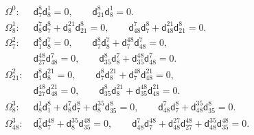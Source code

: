 \documentclass[10pt,a4paper,reqno]{article}
\theoremstyle{definition}
\numberwithin{equation}{section}
\newcommand{\ddtwo}[2]{\mathsf d^{#1}_{#2}}          %
\begin{document}
\begin{table}[htp!]
\centering
\[
\begin{aligned}
\Omega^0:\ & \ddtwo{8}{7}\ddtwo{1}{8}=0,\qquad \ddtwo{8}{21}\ddtwo{1}{8}=0.\\[2pt]
\Omega^1_8:\ & \ddtwo{7}{8}\ddtwo{8}{7}+\ddtwo{21}{8}\ddtwo{8}{21}=0,\qquad
              \ddtwo{7}{48}\ddtwo{8}{7}+\ddtwo{21}{48}\ddtwo{8}{21}=0.\\[2pt]
\Omega^2_7:\ & \ddtwo{8}{1}\ddtwo{7}{8}=0,\qquad
               \ddtwo{8}{7}\ddtwo{7}{8}+\ddtwo{48}{7}\ddtwo{7}{48}=0,\\
             & \ddtwo{48}{27}\ddtwo{7}{48}=0,\qquad
               \ddtwo{8}{35}\ddtwo{7}{8}+\ddtwo{48}{35}\ddtwo{7}{48}=0.\\[2pt]
\Omega^2_{21}:\ & \ddtwo{8}{1}\ddtwo{21}{8}=0,\qquad
                  \ddtwo{8}{7}\ddtwo{21}{8}+\ddtwo{48}{7}\ddtwo{21}{48}=0,\\
                & \ddtwo{48}{27}\ddtwo{21}{48}=0,\qquad
                  \ddtwo{8}{35}\ddtwo{21}{8}+\ddtwo{48}{35}\ddtwo{21}{48}=0.\\[2pt]
\Omega^3_8:\ & \ddtwo{1}{8}\ddtwo{8}{1}+\ddtwo{7}{8}\ddtwo{8}{7}+\ddtwo{35}{8}\ddtwo{8}{35}=0,\qquad
               \ddtwo{7}{48}\ddtwo{8}{7}+\ddtwo{35}{48}\ddtwo{8}{35}=0.\\[2pt]
\Omega^3_{48}:\ & \ddtwo{7}{8}\ddtwo{48}{7}+\ddtwo{35}{8}\ddtwo{48}{35}=0,\qquad
                  \ddtwo{7}{48}\ddtwo{48}{7}+\ddtwo{27}{48}\ddtwo{48}{27}+\ddtwo{35}{48}\ddtwo{48}{35}=0.
\end{aligned}
\]
\caption{Second-order identities $d^2=0$}
\label{table:d2}
\end{table}
\end{document}
